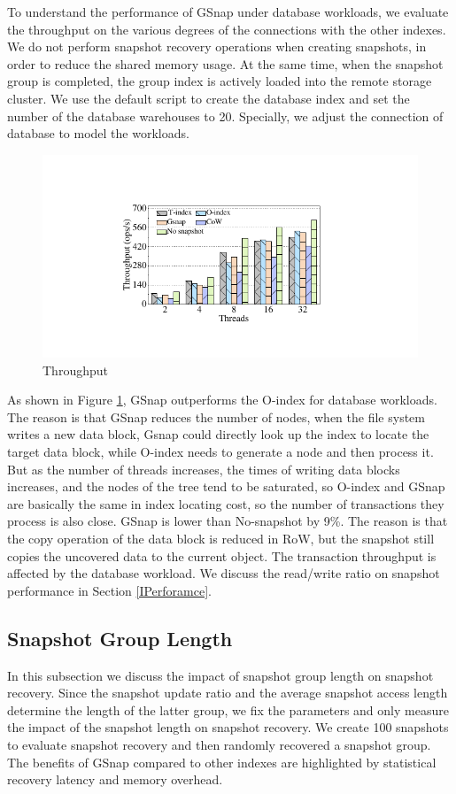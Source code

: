 \documentclass[sigconf, nonacm]{acmart}
\begin{document}
To understand the performance of GSnap under database workloads, we evaluate the throughput on the various degrees of the connections with the other indexes. We do not perform snapshot recovery operations when creating snapshots, in order to reduce the shared memory usage. At the same time, when the snapshot group is completed, the group index is actively loaded into the remote storage cluster. We use the default script to create the database index and set the number of the database warehouses to 20. Specially, we adjust the connection of database to model the workloads.

\begin{figure}[htbp]
	\centering
	\includegraphics[width=0.8\columnwidth]{figures/ceph_pic/eval_overview.pdf}
	\caption{Throughput }
	\label{fig:databasethroughput}
\end{figure}

As shown in Figure \ref{fig:databasethroughput}, GSnap outperforms the O-index for database workloads. The reason is that GSnap reduces the number of nodes, when the file system writes a new data block, Gsnap could directly look up the index to locate the target data block, while O-index needs to generate a node and then process it.
But as the number of threads increases, the times of writing data blocks increases, and the nodes of the tree tend to be saturated, so O-index and GSnap are basically the same in index locating cost, so the number of transactions they process is also close. GSnap is lower than No-snapshot by 9\%. The reason is that the copy operation of the data block is reduced in RoW, but the snapshot still copies the uncovered data to the current object. The transaction throughput is affected by the database workload. We discuss the read/write ratio on snapshot performance in Section \ref{IPerforamce}.

\subsection{Snapshot Group Length}
In this subsection we discuss the impact of snapshot group length on snapshot recovery. Since the snapshot update ratio and the average snapshot access length determine the length of the latter group, we fix the parameters and only measure the impact of the snapshot length on snapshot recovery. We create 100 snapshots to evaluate snapshot recovery and then randomly recovered a snapshot group. The benefits of GSnap compared to other indexes are highlighted by statistical recovery latency and memory overhead.
\end{document}
